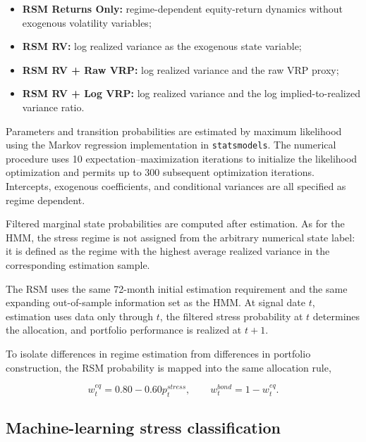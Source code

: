 \begin{itemize}
    \item \textbf{RSM Returns Only:}
    regime-dependent equity-return dynamics without exogenous volatility variables;

    \item \textbf{RSM RV:}
    log realized variance as the exogenous state variable;

    \item \textbf{RSM RV + Raw VRP:}
    log realized variance and the raw VRP proxy;

    \item \textbf{RSM RV + Log VRP:}
    log realized variance and the log implied-to-realized variance ratio.
\end{itemize}

Parameters and transition probabilities are estimated by maximum likelihood using the Markov regression implementation in \texttt{statsmodels}. The numerical procedure uses 10 expectation--maximization
iterations to initialize the likelihood optimization and permits up to 300 subsequent
optimization iterations. Intercepts, exogenous coefficients, and conditional variances are all
specified as regime dependent.

Filtered marginal state probabilities are computed after estimation. As for the HMM, the stress
regime is not assigned from the arbitrary numerical state label: it is defined as the regime with
the highest average realized variance in the corresponding estimation sample.

The RSM uses the same 72-month initial estimation requirement and the same expanding
out-of-sample information set as the HMM. At signal date $t$, estimation uses data only through
$t$, the filtered stress probability at $t$ determines the allocation, and portfolio performance is
realized at $t+1$.

To isolate differences in regime estimation from differences in portfolio construction, the RSM
probability is mapped into the same allocation rule,

\begin{equation}
w_t^{eq}
=
0.80
-
0.60
p_t^{stress},
\qquad
w_t^{bond}
=
1-w_t^{eq}.
\end{equation}

\subsection{Machine-learning stress classification}


